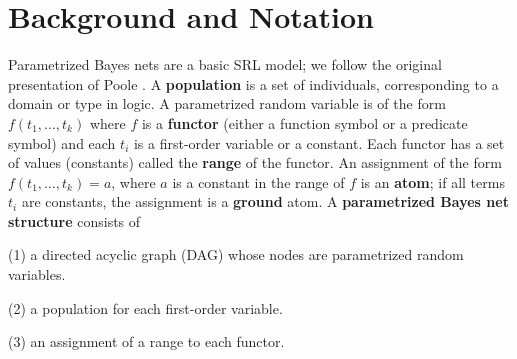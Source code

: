 \documentclass[letterpaper]{article}
\begin{document}



\section{Background and Notation}

Parametrized Bayes nets are a basic SRL model; we follow the original presentation of Poole . A \textbf{population} is a set of individuals, corresponding to a domain or type in logic. A parametrized random variable is of the form $f(t_{1},\ldots,t_{k})$ where $f$ is a \textbf{functor} (either a function symbol or a predicate symbol) and each $t_{i}$ is a first-order variable or a constant. Each functor has a set of values (constants) called the \textbf{range} of the functor. An assignment of the form $f(t_{1},\ldots,t_{k}) = a$, where $a$ is a constant in the range of $f$ is an \textbf{atom}; if all terms $t_{i}$ are constants, the assignment is a \textbf{ground} atom.
A \textbf{parametrized Bayes net structure} consists of

(1) a directed acyclic graph (DAG) whose nodes are parametrized random variables.

 (2) a population for each first-order variable.

 (3) an assignment of a range to each functor.


\end{document}
